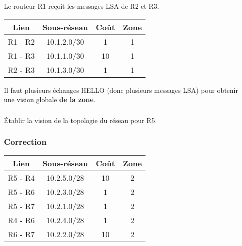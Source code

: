 \documentclass[svgnames,11pt]{beamer}
\begin{document}
\begin{frame}
    \frametitle{}
Le routeur R1 reçoit les messages LSA de R2 et R3.
    \begin{center}
        \begin{tabular}{|*{4}{c|}}
            \hline
            Lien    & Sous-réseau & Coût & Zone \\
            \hline
            R1 - R2 & 10.1.2.0/30 & 1    & 1    \\
            \hline
            R1 - R3 & 10.1.1.0/30 & 10   & 1    \\
            \hline
            R2 - R3 & 10.1.3.0/30 & 1    & 1    \\
            \hline
        \end{tabular}
    \end{center}
    \begin{aretenir}[]
        Il faut plusieurs échanges HELLO (donc plusieurs messages LSA) pour obtenir une vision globale \textbf{de la zone}.
    \end{aretenir}
\end{frame}

\begin{frame}
    \frametitle{}

    \begin{activite}
        Établir la vision de la topologie du réseau pour R5.
    \end{activite}

\end{frame}

\begin{frame}
    \frametitle{Correction}

    \begin{center}
        \begin{tabular}{|*{4}{c|}}
            \hline
            Lien    & Sous-réseau & Coût & Zone \\
            \hline
            R5 - R4 & 10.2.5.0/28 & 10   & 2    \\
            \hline
            R5 - R6 & 10.2.3.0/28 & 1    & 2    \\
            \hline
            R5 - R7 & 10.2.1.0/28 & 1    & 2    \\
            \hline
            R4 - R6 & 10.2.4.0/28 & 1    & 2    \\
            \hline
            R6 - R7 & 10.2.2.0/28 & 10    & 2    \\
            \hline
        \end{tabular}
    \end{center}

\end{frame}
\end{document}
